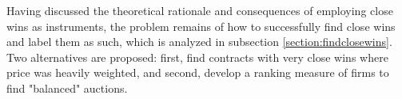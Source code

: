 Having discussed the theoretical rationale and consequences of employing close wins as instruments, the problem remains of how to successfully find close wins and label them as such, which is analyzed in subsection \ref{section:findclosewins}. Two alternatives are proposed: first, find contracts with very close wins where price was heavily weighted, and second, develop a ranking measure of firms to find "balanced" auctions.

